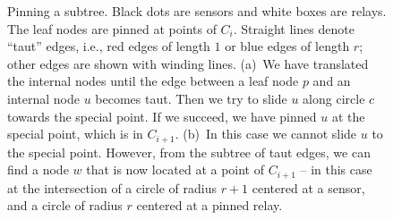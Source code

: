 \documentclass[11pt,a4paper]{article}
\theoremstyle{definition}
\theoremstyle{remark}
\begin{document}
\begin{figure}[b!]
    \centering
    \caption{Pinning a subtree. Black dots are sensors and white boxes are relays. The leaf nodes are pinned at points of $C_i$. Straight lines denote ``taut'' edges, i.e., red edges of length $1$ or blue edges of length $r$; other edges are shown with winding lines. (a)~We have translated the internal nodes until the edge between a leaf node $p$ and an internal node $u$ becomes taut. Then we try to slide $u$ along circle $c$ towards the special point. If we succeed, we have pinned $u$ at the special point, which is in $C_{i+1}$. (b)~In this case we cannot slide $u$ to the special point. However, from the subtree of taut edges, we can find a node $w$ that is now located at a point of $C_{i+1}$ -- in this case at the intersection of a circle of radius $r+1$ centered at a sensor, and a circle of radius $r$ centered at a pinned relay.}\label{fig:pinsubtree}
\end{figure}
\end{document}
